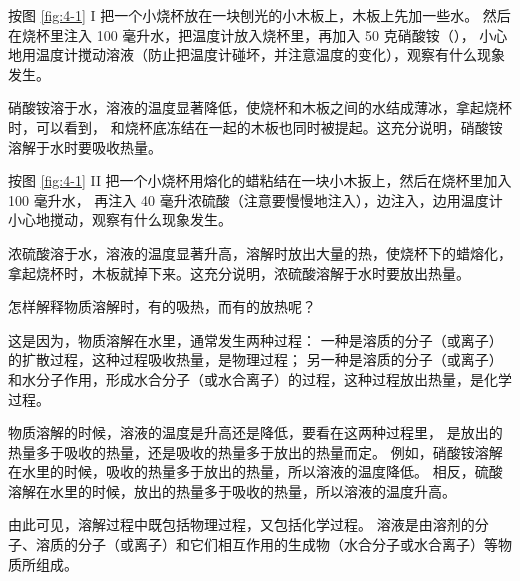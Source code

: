 \begin{shiyan}
    按图 \ref{fig:4-1} I 把一个小烧杯放在一块刨光的小木板上，木板上先加一些水。
    然后在烧杯里注入 100 毫升水，把温度计放入烧杯里，再加入 50 克硝酸铵（），
    小心地用温度计搅动溶液（防止把温度计碰坏，并注意温度的变化），观察有什么现象发生。
\end{shiyan}


硝酸铵溶于水，溶液的温度显著降低，使烧杯和木板之间的水结成薄冰，拿起烧杯时，可以看到，
和烧杯底冻结在一起的木板也同时被提起。这充分说明，硝酸铵溶解于水时要吸收热量。

\begin{shiyan}
    按图 \ref{fig:4-1} II 把一个小烧杯用熔化的蜡粘结在一块小木扳上，然后在烧杯里加入 100 毫升水，
    再注入 40 毫升浓硫酸（注意要慢慢地注入），边注入，边用温度计小心地搅动，观察有什么现象发生。
\end{shiyan}

浓硫酸溶于水，溶液的温度显著升高，溶解时放出大量的热，使烧杯下的蜡熔化，
拿起烧杯时，木板就掉下来。这充分说明，浓硫酸溶解于水时要放出热量。

怎样解释物质溶解时，有的吸热，而有的放热呢？

这是因为，物质溶解在水里，通常发生两种过程：
一种是溶质的分子（或离子）的扩散过程，这种过程吸收热量，是物理过程；
另一种是溶质的分子（或离子）和水分子作用，形成水合分子（或水合离子）的过程，这种过程放出热量，是化学过程。

物质溶解的时候，溶液的温度是升高还是降低，要看在这两种过程里，
是放出的热量多于吸收的热量，还是吸收的热量多于放出的热量而定。
例如，硝酸铵溶解在水里的时候，吸收的热量多于放出的热量，所以溶液的温度降低。
相反，硫酸  溶解在水里的时候，放出的热量多于吸收的热量，所以溶液的温度升高。

由此可见，溶解过程中既包括物理过程，又包括化学过程。
溶液是由溶剂的分子、溶质的分子（或离子）和它们相互作用的生成物（水合分子或水合离子）等物质所组成。


\begin{xiti}



\end{xiti}


